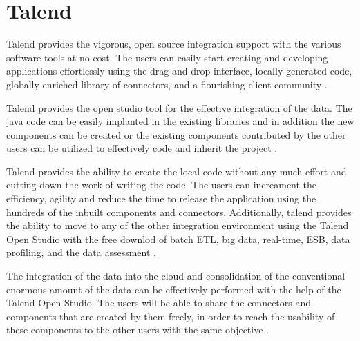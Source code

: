 \section{Talend}

Talend provides the vigorous, open source integration support with the various 
software tools at no cost. The users can easily start creating and developing 
applications effortlessly using the drag-and-drop interface, locally generated 
code, globally enriched library of connectors, and a flourishing client 
community \cite{hid-sp18-412-talend_products}.

Talend provides the open studio tool for the effective integration of the data.
 The java code can be easily implanted in the existing libraries and in 
addition the new components can be created or the existing components 
contributed by the other users can be utilized to effectively code and 
inherit the project \cite{hid-sp18-412-talend_open_studio}.

Talend provides the ability to create the local code without any much effort 
and cutting down the work of writing the code.
The users can increament the efficiency, agility and 
reduce the time to release the application using the hundreds of the 
inbuilt components  and connectors. Additionally, talend provides the 
ability to move to any of the other integration environment using the 
Talend Open Studio with the free downlod of batch ETL, big data, real-time, 
ESB, data profiling, and 
the data assessment \cite{hid-sp18-412-talend_products}.

The integration of the data into the cloud and consolidation of the 
conventional enormous amount of the data can be effectively performed 
with the help of the Talend Open Studio. The users will be able to share 
the connectors and components that are created by them freely, 
in order to reach the usability of these components to the 
other users with the same objective \cite{hid-sp18-412-talend_products}.

